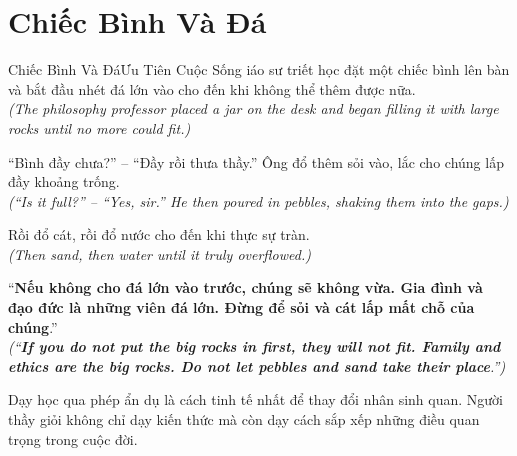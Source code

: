 \section{Chiếc Bình Và Đá}
\begin{truyen}{Chiếc Bình Và Đá}{Ưu Tiên Cuộc Sống}
iáo sư triết học đặt một chiếc bình lên bàn và bắt đầu nhét đá lớn vào cho đến khi không thể thêm được nữa.\\
\textit{(The philosophy professor placed a jar on the desk and began filling it with large rocks until no more could fit.)}

``Bình đầy chưa?'' – ``Đầy rồi thưa thầy.'' Ông đổ thêm sỏi vào, lắc cho chúng lấp đầy khoảng trống.\\
\textit{(``Is it full?'' – ``Yes, sir.'' He then poured in pebbles, shaking them into the gaps.)}

Rồi đổ cát, rồi đổ nước cho đến khi thực sự tràn.\\
\textit{(Then sand, then water until it truly overflowed.)}

``\textbf{Nếu không cho đá lớn vào trước, chúng sẽ không vừa. Gia đình và đạo đức là những viên đá lớn. Đừng để sỏi và cát lấp mất chỗ của chúng}.''\\
\textit{(``\textbf{If you do not put the big rocks in first, they will not fit. Family and ethics are the big rocks. Do not let pebbles and sand take their place}.'')}
\end{truyen}
\begin{baihoc}
  Dạy học qua phép ẩn dụ là cách tinh tế nhất để thay đổi nhân sinh quan. Người thầy giỏi không chỉ dạy kiến thức mà còn dạy cách sắp xếp những điều quan trọng trong cuộc đời.
\end{baihoc}

